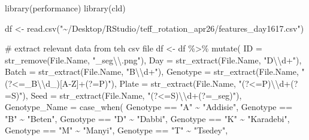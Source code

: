 \documentclass[
  letterpaper,
  DIV=11,
  numbers=noendperiod]{scrartcl}
\newenvironment{Shaded}{\begin{snugshade}}{\end{snugshade}}
\newcommand{\AttributeTok}[1]{\textcolor[rgb]{0.40,0.45,0.13}{#1}}
\newcommand{\CommentTok}[1]{\textcolor[rgb]{0.37,0.37,0.37}{#1}}
\newcommand{\FunctionTok}[1]{\textcolor[rgb]{0.28,0.35,0.67}{#1}}
\newcommand{\NormalTok}[1]{\textcolor[rgb]{0.00,0.23,0.31}{#1}}
\newcommand{\OtherTok}[1]{\textcolor[rgb]{0.00,0.23,0.31}{#1}}
\newcommand{\SpecialCharTok}[1]{\textcolor[rgb]{0.37,0.37,0.37}{#1}}
\newcommand{\StringTok}[1]{\textcolor[rgb]{0.13,0.47,0.30}{#1}}
\begin{document}
\begin{Shaded}
\begin{Highlighting}[]
\FunctionTok{library}\NormalTok{(performance)}
\FunctionTok{library}\NormalTok{(cld)}

\NormalTok{df }\OtherTok{\textless{}{-}} \FunctionTok{read.csv}\NormalTok{(}\StringTok{"\textasciitilde{}/Desktop/RStudio/teff\_rotation\_apr26/features\_day1617.csv"}\NormalTok{)}

\CommentTok{\# extract relevant data from teh csv file}
\NormalTok{df }\OtherTok{\textless{}{-}}\NormalTok{ df }\SpecialCharTok{\%\textgreater{}\%}
  \FunctionTok{mutate}\NormalTok{(}
    \AttributeTok{ID            =} \FunctionTok{str\_remove}\NormalTok{(File.Name, }\StringTok{"\_seg}\SpecialCharTok{\textbackslash{}\textbackslash{}}\StringTok{.png"}\NormalTok{),}
    \AttributeTok{Day           =} \FunctionTok{str\_extract}\NormalTok{(File.Name, }\StringTok{"D}\SpecialCharTok{\textbackslash{}\textbackslash{}}\StringTok{d+"}\NormalTok{),}
    \AttributeTok{Batch         =} \FunctionTok{str\_extract}\NormalTok{(File.Name, }\StringTok{"B}\SpecialCharTok{\textbackslash{}\textbackslash{}}\StringTok{d+"}\NormalTok{),}
    \AttributeTok{Genotype      =} \FunctionTok{str\_extract}\NormalTok{(File.Name, }\StringTok{"(?\textless{}=\_B}\SpecialCharTok{\textbackslash{}\textbackslash{}}\StringTok{d\_)[A{-}Z]+(?=P)"}\NormalTok{),}
    \AttributeTok{Plate         =} \FunctionTok{str\_extract}\NormalTok{(File.Name, }\StringTok{"(?\textless{}=P)}\SpecialCharTok{\textbackslash{}\textbackslash{}}\StringTok{d+(?=S)"}\NormalTok{),}
    \AttributeTok{Seed          =} \FunctionTok{str\_extract}\NormalTok{(File.Name, }\StringTok{"(?\textless{}=S)}\SpecialCharTok{\textbackslash{}\textbackslash{}}\StringTok{d+(?=\_seg)"}\NormalTok{),}
    \AttributeTok{Genotype\_Name =} \FunctionTok{case\_when}\NormalTok{(}
\NormalTok{      Genotype }\SpecialCharTok{==} \StringTok{"A"} \SpecialCharTok{\textasciitilde{}} \StringTok{"Addisie"}\NormalTok{,}
\NormalTok{      Genotype }\SpecialCharTok{==} \StringTok{"B"} \SpecialCharTok{\textasciitilde{}} \StringTok{"Beten"}\NormalTok{,}
\NormalTok{      Genotype }\SpecialCharTok{==} \StringTok{"D"} \SpecialCharTok{\textasciitilde{}} \StringTok{"Dabbi"}\NormalTok{,}
\NormalTok{      Genotype }\SpecialCharTok{==} \StringTok{"K"} \SpecialCharTok{\textasciitilde{}} \StringTok{"Karadebi"}\NormalTok{,}
\NormalTok{      Genotype }\SpecialCharTok{==} \StringTok{"M"} \SpecialCharTok{\textasciitilde{}} \StringTok{"Manyi"}\NormalTok{,}
\NormalTok{      Genotype }\SpecialCharTok{==} \StringTok{"T"} \SpecialCharTok{\textasciitilde{}} \StringTok{"Tsedey"}\NormalTok{,}

\end{Highlighting}
\end{Shaded}
\end{document}
